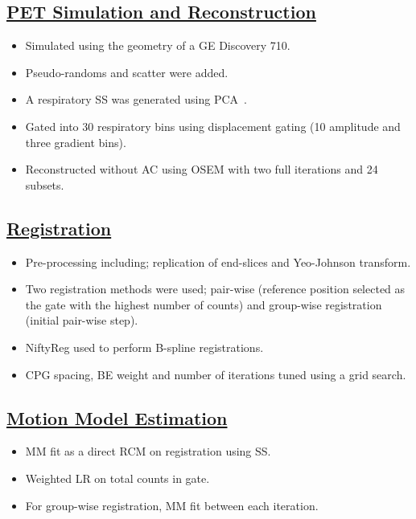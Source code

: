 \documentclass[misc, color=UCLburgundy, margin=1cm]{uclposter}
\DeclareRobustCommand{\glss}[1]
{%
  \ifglsused{#1}{\glsshorts{#1}}{\glslongs{#1} (\glsshorts{#1})\glsunset{#1}}%
}
\begin{document}
\begin{multicols}{4}
            \subsection*{\underline{\textbf{PET Simulation and Reconstruction}}}
                \begin{itemize}
                    \item Simulated using the geometry of a \gls{GE} Discovery 710.
                    \item Pseudo-randoms and scatter were added.
                    \item A respiratory \gls{SS} was generated using \gls{PCA}~\cite{Thielemans2011}.
                    \item Gated into 30 respiratory bins using displacement gating (10 amplitude and three gradient bins).
                    \item Reconstructed without \gls{AC} using \gls{OSEM} with two full iterations and 24 subsets.
                \end{itemize}
            
            \subsection*{\underline{\textbf{Registration}}}
                \begin{itemize}
                    \item Pre-processing including; replication of end-slices and Yeo-Johnson transform.
                    \item Two registration methods were used; pair-wise (reference position selected as the gate with the highest number of counts) and group-wise registration (initial pair-wise step).
                    \item NiftyReg used to perform B-spline registrations.
                    \item \acrlong{CPG} spacing, \acrlong{BE} weight and number of iterations tuned using a grid search.
                \end{itemize}
            
            \subsection*{\underline{\textbf{Motion Model Estimation}}}
                \begin{itemize}
                    \item \gls{MM} fit as a direct \acrlong{RCM} on registration \glss{DVF} using \gls{SS}.
                    \item Weighted \acrlong{LR} on total counts in gate.
                    \item For group-wise registration, \gls{MM} fit between each iteration.
                \end{itemize}
            

\end{multicols}
\end{document}
